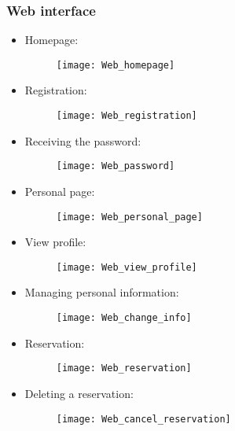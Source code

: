 \subsubsection{Web interface}
\begin{itemize}
	\item Homepage: 
	\begin{figure}[H]
		\centering
		\texttt{[image: Web\_homepage]}
	\end{figure}
\newpage
\item Registration:
\begin{figure}[H]
	\centering
	\texttt{[image: Web\_registration]}
\end{figure}
\newpage
\item Receiving the password:
\begin{figure}[H]
	\centering
	\texttt{[image: Web\_password]}
\end{figure}
\newpage
\item Personal page:
\begin{figure}[H]
	\centering
	\texttt{[image: Web\_personal\_page]}
\end{figure}
\newpage
\item View profile:
\begin{figure}[H]
	\centering
	\texttt{[image: Web\_view\_profile]}
\end{figure}
\newpage
\item Managing personal information:
\begin{figure}[H]
	\centering
	\texttt{[image: Web\_change\_info]}
\end{figure}
\newpage
\item Reservation:
\begin{figure}[H]
	\centering
	\texttt{[image: Web\_reservation]}
\end{figure}
\newpage
\item Deleting a reservation:
\begin{figure}[H]
	\centering
	\texttt{[image: Web\_cancel\_reservation]}
\end{figure}
\end{itemize}
\newpage

